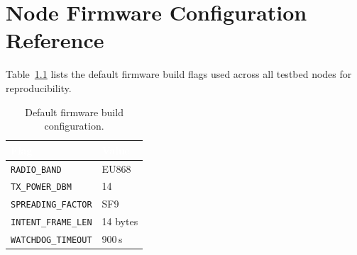 \documentclass[12pt,a4paper]{report}
\begin{document}
\appendix
\chapter{Node Firmware Configuration Reference}
\label{app:firmware}

Table~\ref{tab:firmware} lists the default firmware build flags used across all testbed
nodes for reproducibility.

\begin{table}[H]
\centering
\caption{Default firmware build configuration.}
\label{tab:firmware}
\begin{tabularx}{\textwidth}{@{}lX@{}}
\toprule
\rowcolor{nustgreen}
\textcolor{white}{\bfseries Flag} & \textcolor{white}{\bfseries Value} \\
\midrule
\texttt{RADIO\_BAND}        & EU868 \\
\rowcolor{nustmist}
\texttt{TX\_POWER\_DBM}     & 14 \\
\texttt{SPREADING\_FACTOR}  & SF9 \\
\rowcolor{nustmist}
\texttt{INTENT\_FRAME\_LEN} & 14 bytes \\
\texttt{WATCHDOG\_TIMEOUT}  & 900\,s \\
\bottomrule
\end{tabularx}
\end{table}
\end{document}
